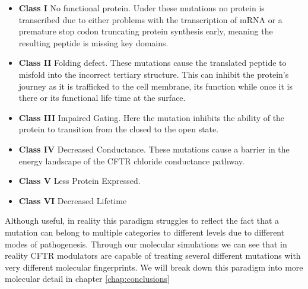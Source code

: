 \begin{itemize}
	\item \textbf{Class I} No functional protein. Under these mutations no protein is transcribed due to either problems with the transcription of mRNA or a premature stop codon truncating protein synthesis early, meaning the resulting peptide is missing key domains. 
	\item \textbf{Class II} Folding defect. These mutations cause the translated peptide to misfold into the incorrect tertiary structure. This can inhibit the protein's journey as it is trafficked to the cell membrane, its function while once it is there or its functional life time at the surface. 
	\item \textbf{Class III} Impaired Gating. Here the mutation inhibits the ability of the protein to transition from the closed to the open state. 
	\item \textbf{Class IV} Decreased Conductance. These mutations cause a barrier in the energy landscape of the CFTR chloride conductance pathway.
	\item \textbf{Class V} Less Protein Expressed.  
	\item \textbf{Class VI} Decreased Lifetime

\end{itemize}

Although useful, in reality this paradigm struggles to reflect the fact that a mutation can belong to multiple categories to different levels due to different modes of pathogenesis. Through our molecular simulations we can see that in reality CFTR modulators are capable of treating several different mutations with very different molecular fingerprints. We will break down this paradigm into more molecular detail in chapter \ref{chap:conclusions}


